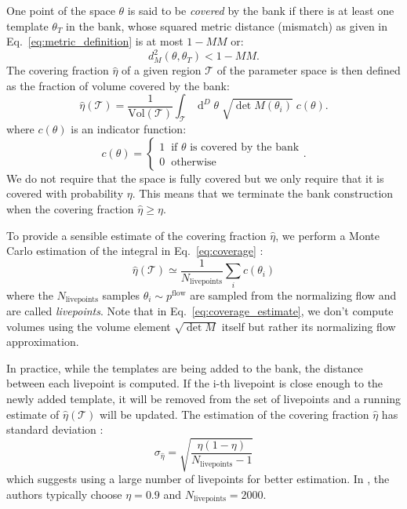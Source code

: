 \documentclass[twocolumn,showpacs,preprintnumbers,nofootinbib,prd,
superscriptaddress,10pt]{revtex4-2}
\newcommand{\dvol}[2]{\ensuremath{\operatorname{d}^{#2}\!{#1}}}
\begin{document}
One point of the space $\theta$ is said to be {\it covered} by the bank if there is at least one template $\theta_T$ in the bank, whose squared metric distance (mismatch) as given in Eq.~\eqref{eq:metric_definition} is at most $1 - MM$ or:
\begin{equation}
	d^2_M(\theta, \theta_T)<1 - MM.
\end{equation}
%
The covering fraction $\hat{\eta}$ of a given region $\mathcal{T}$ of the parameter space is then defined as the fraction of volume covered by the bank:
\begin{equation}\label{eq:coverage}
	\hat{\eta}(\mathcal{T}) = \frac{1}{\text{Vol}(\mathcal{T})} \int_\mathcal{T} \dvol{\theta}{D} \; \sqrt{\det M(\theta_i)} \; c(\theta).
\end{equation}
where $c(\theta)$ is an indicator function:
\begin{equation}
	c(\theta) = \left\{
                \begin{array}{ll}
                  1 \;\; \text{if $\theta$ is covered by the bank}\\
                  0 \;\; \text{otherwise}
                \end{array}.
              \right.
\end{equation}
%
We do not require that the space is fully covered but we only require that it is covered with probability $\eta$. This means that we terminate the bank construction when the covering fraction $\hat{\eta} \geq \eta$.

To provide a sensible estimate of the covering fraction $\hat{\eta}$, we perform a Monte Carlo estimation of the integral in Eq.~\eqref{eq:coverage} \cite{Coogan:2022qxs}:
\begin{equation}\label{eq:coverage_estimate}
	\hat{\eta}(\mathcal{T}) \simeq \frac{1}{N_\text{livepoints}} \sum_i c(\theta_i)
\end{equation}
%
where the $N_\text{livepoints}$ samples $\theta_i \sim p^\text{flow}$ are sampled from the normalizing flow and are called {\it livepoints}.
Note that in Eq.~\eqref{eq:coverage_estimate}, we don't compute volumes using the volume element $\sqrt{\det M}$ itself but rather its normalizing flow approximation.

In practice, while the templates are being added to the bank, the distance between each livepoint is computed. If the i-th livepoint is close enough to the newly added template, it will be removed from the set of livepoints and a running estimate of $\hat{\eta}(\mathcal{T})$ will be updated.
The estimation of the covering fraction $\hat{\eta}$ has standard deviation \cite[App. A]{Coogan:2022qxs}:
\begin{equation}\label{eq:variance_coverage}
	\sigma_{\hat{\eta}} = \sqrt{\frac{\eta(1-\eta)}{N_\text{livepoints}-1}}
\end{equation}
which suggests using a large number of livepoints for better estimation.
In \cite{Coogan:2022qxs}, the authors typically choose $\eta = 0.9$ and $N_\text{livepoints} = 2000$.
\end{document}
